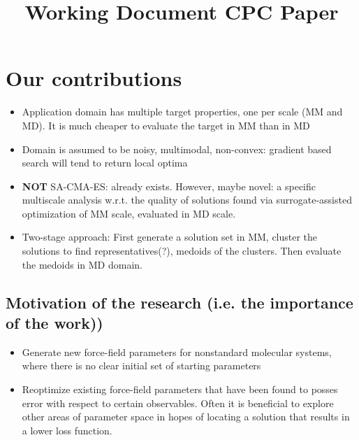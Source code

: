 \documentclass[preprint,12pt]{elsarticle}
\begin{document}
\begin{frontmatter}
\title{Working Document CPC Paper}


\end{frontmatter}

\noindent\makebox[\linewidth]{\rule{\paperwidth}{0.4pt}}

\section{Our contributions}
\begin{itemize}
    \item Application domain has multiple target properties, one per scale (MM and MD). It is much cheaper to evaluate the target in MM than in MD
    \item Domain is assumed to be noisy, multimodal, non-convex: gradient based search will tend to return local optima
    \item \textbf{NOT} SA-CMA-ES: already exists. However, maybe novel: a specific multiscale analysis w.r.t. the quality of solutions found via surrogate-assisted optimization of MM scale, evaluated in MD scale. 
    \item Two-stage approach: First generate a solution set in MM, cluster the solutions to find representatives(?), medoids of the clusters. Then evaluate the medoids in MD domain. 
\end{itemize}

\subsection{Motivation of the research (i.e. the importance of the work))}
\begin{itemize}
    \item Generate new force-field parameters for nonstandard molecular systems, where there is no clear initial set of starting parameters
    \item Reoptimize existing force-field parameters that have been found to posses error with respect to certain observables. Often it is beneficial to explore other areas of parameter space in hopes of locating a solution that results in a lower loss function.
\end{itemize}
\end{document}
